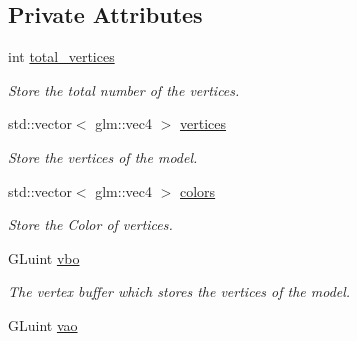 \subsection*{Private Attributes}
\begin{DoxyCompactItemize}
\item 
int \hyperlink{classcft_1_1Model_a88fa7ed2fc1df377eae4a8f5ebec5573}{total\+\_\+vertices}\hypertarget{classcft_1_1Model_a88fa7ed2fc1df377eae4a8f5ebec5573}{}\label{classcft_1_1Model_a88fa7ed2fc1df377eae4a8f5ebec5573}

\begin{DoxyCompactList}\small\item\em Store the total number of the vertices. \end{DoxyCompactList}\item 
std\+::vector$<$ glm\+::vec4 $>$ \hyperlink{classcft_1_1Model_a807aeb1a9028c5dba4cff151d8e3eeb7}{vertices}\hypertarget{classcft_1_1Model_a807aeb1a9028c5dba4cff151d8e3eeb7}{}\label{classcft_1_1Model_a807aeb1a9028c5dba4cff151d8e3eeb7}

\begin{DoxyCompactList}\small\item\em Store the vertices of the model. \end{DoxyCompactList}\item 
std\+::vector$<$ glm\+::vec4 $>$ \hyperlink{classcft_1_1Model_acebb2d746a7f386c145c4c63c636cc8a}{colors}\hypertarget{classcft_1_1Model_acebb2d746a7f386c145c4c63c636cc8a}{}\label{classcft_1_1Model_acebb2d746a7f386c145c4c63c636cc8a}

\begin{DoxyCompactList}\small\item\em Store the Color of vertices. \end{DoxyCompactList}\item 
G\+Luint \hyperlink{classcft_1_1Model_a25d4b411fc51d3e92a6afb62dfc7c70b}{vbo}\hypertarget{classcft_1_1Model_a25d4b411fc51d3e92a6afb62dfc7c70b}{}\label{classcft_1_1Model_a25d4b411fc51d3e92a6afb62dfc7c70b}

\begin{DoxyCompactList}\small\item\em The vertex buffer which stores the vertices of the model. \end{DoxyCompactList}\item 
G\+Luint \hyperlink{classcft_1_1Model_a5e6908dcb906d1ba8a79181be7e4ddce}{vao}\hypertarget{classcft_1_1Model_a5e6908dcb906d1ba8a79181be7e4ddce}{}\label{classcft_1_1Model_a5e6908dcb906d1ba8a79181be7e4ddce}


\end{DoxyCompactItemize}
